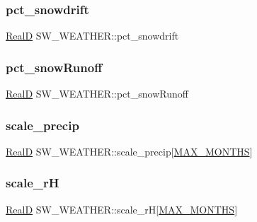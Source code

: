 \subsubsection{\texorpdfstring{pct\+\_\+snowdrift}{pct\_snowdrift}}
{\footnotesize\ttfamily \hyperlink{generic_8h_af1c105fd5732f70b91ddaeda0cc340e3}{RealD} S\+W\+\_\+\+W\+E\+A\+T\+H\+E\+R\+::pct\+\_\+snowdrift}

\mbox{\label{struct_s_w___w_e_a_t_h_e_r_a4526d6a3fa640bd31a13c32dfc570c08}} 
\subsubsection{\texorpdfstring{pct\+\_\+snow\+Runoff}{pct\_snowRunoff}}
{\footnotesize\ttfamily \hyperlink{generic_8h_af1c105fd5732f70b91ddaeda0cc340e3}{RealD} S\+W\+\_\+\+W\+E\+A\+T\+H\+E\+R\+::pct\+\_\+snow\+Runoff}

\mbox{\label{struct_s_w___w_e_a_t_h_e_r_a2170f122c587227dac45c3a43e7b8c95}} 
\subsubsection{\texorpdfstring{scale\+\_\+precip}{scale\_precip}}
{\footnotesize\ttfamily \hyperlink{generic_8h_af1c105fd5732f70b91ddaeda0cc340e3}{RealD} S\+W\+\_\+\+W\+E\+A\+T\+H\+E\+R\+::scale\+\_\+precip\mbox{[}\hyperlink{_times_8h_a9c97e6841188b672e984a4eba7479277}{M\+A\+X\+\_\+\+M\+O\+N\+T\+HS}\mbox{]}}

\mbox{\label{struct_s_w___w_e_a_t_h_e_r_a2b842194349c9497002b60fadb9a8db4}} 
\subsubsection{\texorpdfstring{scale\+\_\+rH}{scale\_rH}}
{\footnotesize\ttfamily \hyperlink{generic_8h_af1c105fd5732f70b91ddaeda0cc340e3}{RealD} S\+W\+\_\+\+W\+E\+A\+T\+H\+E\+R\+::scale\+\_\+rH\mbox{[}\hyperlink{_times_8h_a9c97e6841188b672e984a4eba7479277}{M\+A\+X\+\_\+\+M\+O\+N\+T\+HS}\mbox{]}}

